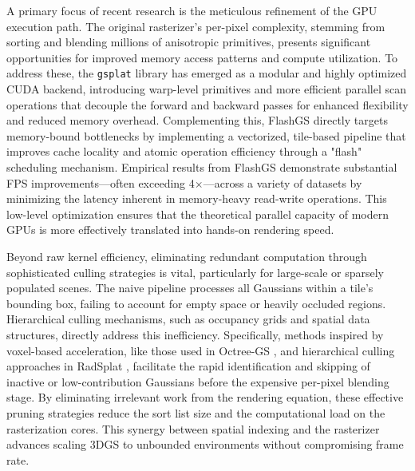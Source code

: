 \documentclass[11pt,a4paper]{article}
\begin{document}
A primary focus of recent research is the meticulous refinement of the GPU execution path. The original rasterizer's per-pixel complexity, stemming from sorting and blending millions of anisotropic primitives, presents significant opportunities for improved memory access patterns and compute utilization. To address these, the \texttt{gsplat} library has emerged as a modular and highly optimized CUDA backend, introducing warp-level primitives and more efficient parallel scan operations that decouple the forward and backward passes for enhanced flexibility and reduced memory overhead. Complementing this, FlashGS \cite{arxiv:2006.04972v1} directly targets memory-bound bottlenecks by implementing a vectorized, tile-based pipeline that improves cache locality and atomic operation efficiency through a "flash" scheduling mechanism. Empirical results from FlashGS demonstrate substantial FPS improvements---often exceeding 4$\times$---across a variety of datasets by minimizing the latency inherent in memory-heavy read-write operations. This low-level optimization ensures that the theoretical parallel capacity of modern GPUs is more effectively translated into hands-on rendering speed.

Beyond raw kernel efficiency, eliminating redundant computation through sophisticated culling strategies is vital, particularly for large-scale or sparsely populated scenes. The naive pipeline processes all Gaussians within a tile's bounding box, failing to account for empty space or heavily occluded regions. Hierarchical culling mechanisms, such as occupancy grids and spatial data structures, directly address this inefficiency. Specifically, methods inspired by voxel-based acceleration, like those used in Octree-GS \cite{arxiv:2403.17898v1}, and hierarchical culling approaches in RadSplat \cite{arxiv:2403.13806v1}, facilitate the rapid identification and skipping of inactive or low-contribution Gaussians before the expensive per-pixel blending stage. By eliminating irrelevant work from the rendering equation, these effective pruning strategies reduce the sort list size and the computational load on the rasterization cores. This synergy between spatial indexing and the rasterizer advances scaling 3DGS to unbounded environments without compromising frame rate.
\end{document}
